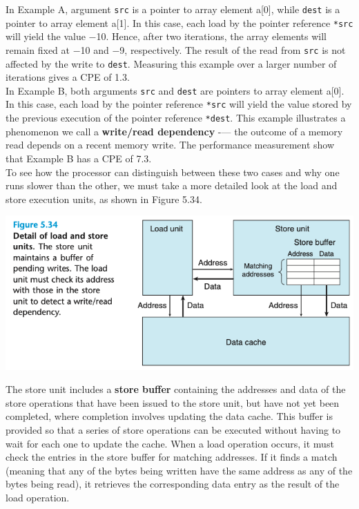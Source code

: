 \documentclass[11pt]{article}
\begin{document}
In Example A, argument \texttt{src} is a pointer to array element a[0], while \texttt{dest} is a pointer to array element a[1]. In this case, each load by the pointer reference \texttt{*src} will yield the value −10. Hence, after two iterations, the array elements will remain fixed at −10 and −9, respectively. The result of the read from \texttt{src} is not affected by the write to \texttt{dest}.  Measuring this example over a larger number of iterations gives a CPE of 1.3.\\

In Example B, both arguments \texttt{src} and \texttt{dest} are pointers to array element a[0]. In this case, each load by the pointer reference \texttt{*src} will yield the value stored by the previous execution of the pointer reference \texttt{*dest}. This example illustrates a phenomenon we call a \textbf{write/read dependency} -— the outcome of a memory read depends on a recent memory write. The performance measurement show that Example B has a CPE of 7.3.\\

To see how the processor can distinguish between these two cases and why one runs slower than the other, we must take a more detailed look at the load and store execution units, as shown in Figure 5.34.\\

\begin{center}
\includegraphics[width=.9\linewidth]{pics/figure5.34-detail-of-load-and-store-units.png}
\end{center}

The store unit includes a \textbf{store buffer} containing the addresses and data of the store operations that have been issued to the store unit, but have not yet been completed, where completion involves updating the data cache. This buffer is provided so that a series of store operations can be executed without having to wait for each one to update the cache. When a load operation occurs, it must check the entries in the store buffer for matching addresses. If it finds a match (meaning that any of the bytes being written have the same address as any of the bytes being read), it retrieves the corresponding data entry as the result of the load operation.\\
\end{document}
